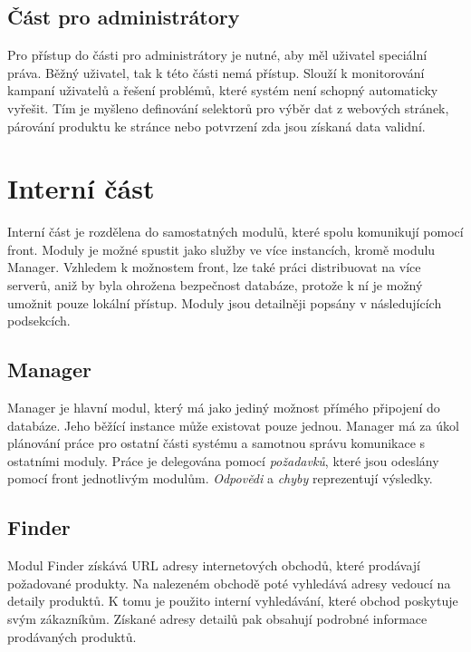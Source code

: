 \documentclass[thesis=B,czech]{FITthesis}[2012/06/26]
\begin{document}
\subsection{Část pro administrátory}
Pro přístup do části pro administrátory je nutné, aby měl uživatel speciální práva. Běžný uživatel, tak k této části nemá přístup. Slouží k monitorování kampaní uživatelů a řešení problémů, které systém není schopný 
automaticky vyřešit. Tím je myšleno definování selektorů pro výběr dat z webových stránek, párování produktu ke stránce 
nebo potvrzení zda jsou získaná data validní.

\section{Interní část}
Interní část je rozdělena do samostatných modulů, které spolu komunikují pomocí front. Moduly je možné spustit jako služby ve více 
instancích, kromě modulu Manager. Vzhledem k možnostem front, lze také práci distribuovat na více serverů, aniž by byla ohrožena 
bezpečnost databáze, protože k ní je možný umožnit pouze lokální přístup. Moduly jsou detailněji popsány v následujících podsekcích.
\subsection{Manager}
Manager je hlavní modul, který má jako jediný možnost přímého připojení do databáze. Jeho běžící instance může existovat pouze jednou.
Manager má za úkol plánování práce pro ostatní části systému a samotnou správu komunikace s ostatními moduly. Práce je delegována pomocí
\textit{požadavků}, které jsou odeslány pomocí front jednotlivým modulům. \textit{Odpovědi} a \textit{chyby} reprezentují výsledky.
\subsection{Finder}
Modul Finder získává URL adresy internetových obchodů, které prodávají požadované produkty.
Na nalezeném obchodě poté vyhledává adresy vedoucí na detaily produktů. K tomu je použito interní vyhledávání, které
obchod poskytuje svým zákazníkům. Získané adresy detailů pak obsahují podrobné informace prodávaných produktů.
\end{document}
